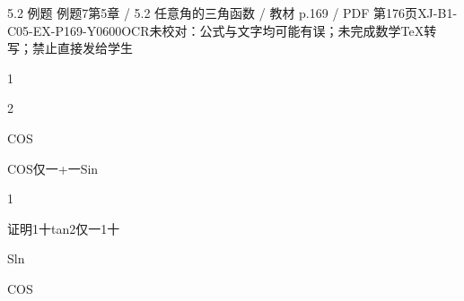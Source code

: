 \begin{bankitem}{5.2 例题 例题7}{第5章 / 5.2 任意角的三角函数 / 教材 p.169 / PDF 第176页}{XJ-B1-C05-EX-P169-Y0600}{OCR未校对：公式与文字均可能有误；未完成数学TeX转写；禁止直接发给学生}
\begin{ocrdraft}
\par
1
\par
2
\par
COS
\par
COS仅一+一Sin
\par
1
\par
证明1十tan2仅一1十
\par
Sln
\par
COS
\end{ocrdraft}
\end{bankitem}
